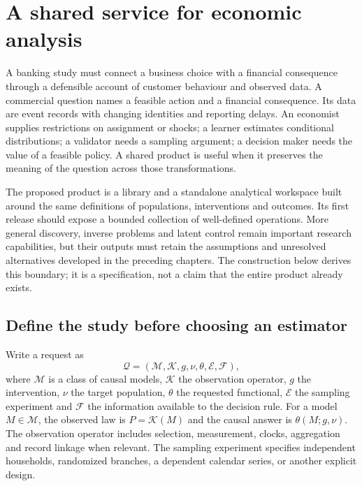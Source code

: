 \chapter{A shared service for economic analysis}
\label{r3:product}

A banking study must connect a business choice with a financial consequence
through a defensible account of customer behaviour and observed data. A commercial question names a feasible action
and a financial consequence. Its data are event records with changing
identities and reporting delays. An economist supplies restrictions on
assignment or shocks; a learner estimates conditional distributions; a
validator needs a sampling argument; a decision maker needs the value of
a feasible policy. A shared product is useful when it preserves the
meaning of the question across those transformations.

The proposed product is a library and a standalone analytical workspace
built around the same definitions of populations, interventions and outcomes. Its first release should expose
a bounded collection of well-defined operations. More general discovery,
inverse problems and latent control remain important research capabilities,
but their outputs must retain the assumptions and unresolved alternatives
developed in the preceding chapters. The construction below derives this
boundary; it is a specification, not a claim that the entire product
already exists.

\section{Define the study before choosing an estimator}
\label{r3:request-type}

Write a request as
\begin{equation}
 \mathcal Q=(\mathcal M,\mathcal K,g,\nu,\theta,\mathcal E,\mathcal F),
 \label{r3:request}
\end{equation}
where $\mathcal M$ is a class of causal models, $\mathcal K$ the observation
operator, $g$ the intervention, $\nu$ the target population, $\theta$
the requested functional, $\mathcal E$ the sampling experiment and
$\mathcal F$ the information available to the decision rule. For a model
$M\in\mathcal M$, the observed law is $P=\mathcal K(M)$ and the causal
answer is $\theta(M;g,\nu)$. The observation operator includes selection,
measurement, clocks, aggregation and record linkage when relevant.
The sampling experiment specifies independent households, randomized
branches, a dependent calendar series, or another explicit design.


